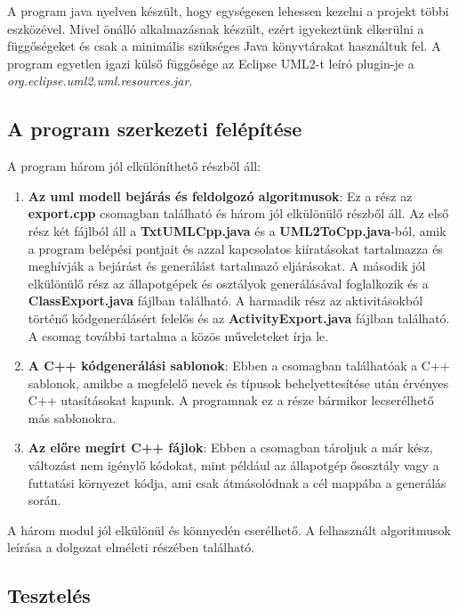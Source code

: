 \documentclass[a4paper,12pt]{report}
\begin{document}
A program java nyelven készült, hogy egységesen lehessen kezelni a projekt többi eszközével. Mivel önálló alkalmazásnak készült, ezért igyekeztünk elkerülni a függőségeket és csak a minimális szükséges Java könyvtárakat használtuk fel. A program egyetlen igazi külső függősége az Eclipse UML2-t leíró plugin-je a {\it org.eclipse.uml2.uml.resources.jar}.

\subsection{A program szerkezeti felépítése}

A program három jól elkülöníthető részből áll:
\begin{enumerate}
\item {\bf Az uml modell bejárás és feldolgozó algoritmusok}: Ez a rész az {\bf export.cpp} csomagban található és három jól elkülönülő részből áll. Az első rész két fájlból áll a {\bf TxtUMLCpp.java} és a {\bf UML2ToCpp.java}-ból, amik a program belépési pontjait és azzal kapcsolatos kiíratásokat tartalmazza és meghívják a bejárást és generálást tartalmazó eljárásokat. A második jól elkülönülő rész az állapotgépek és osztályok generálásával foglalkozik és a {\bf ClassExport.java} fájlban található. A harmadik rész az aktivitásokból történő kódgenerálásért felelős és az {\bf ActivityExport.java} fájlban található. A csomag további tartalma a közös műveleteket írja le. 
\item {\bf A C++ kódgenerálási sablonok}: Ebben a csomagban találhatóak a C++ sablonok, amikbe a megfelelő nevek és típusok behelyettesítése után érvényes C++ utasításokat kapunk. A programnak ez a része bármikor lecserélhető más sablonokra.
\item {\bf Az előre megírt C++ fájlok}: Ebben a csomagban tároljuk a már kész, változást nem igénylő kódokat, mint például az állapotgép ősosztály vagy a futtatási környezet kódja, ami csak átmásolódnak a cél mappába a generálás során.
\end{enumerate}
A három modul jól elkülönül és könnyedén cserélhető. A felhasznált algoritmusok leírása a dolgozat elméleti részében található.

\subsection{Tesztelés}
\end{document}
